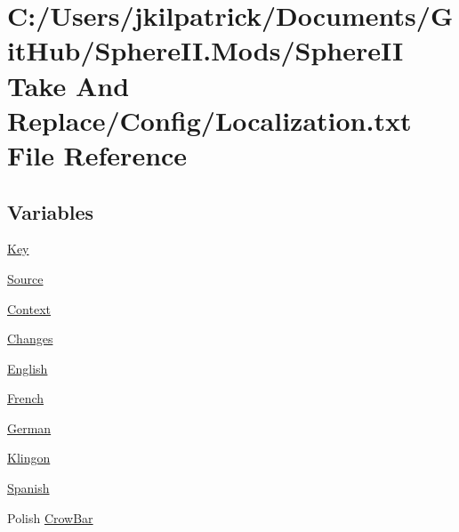 \hypertarget{_sphere_i_i_01_take_01_and_01_replace_2_config_2_localization_8txt}{}\section{C\+:/\+Users/jkilpatrick/\+Documents/\+Git\+Hub/\+Sphere\+II.Mods/\+Sphere\+II Take And Replace/\+Config/\+Localization.txt File Reference}
\label{_sphere_i_i_01_take_01_and_01_replace_2_config_2_localization_8txt}
\subsection*{Variables}
\begin{DoxyCompactItemize}
\item 
\mbox{\hyperlink{_sphere_i_i_01_take_01_and_01_replace_2_config_2_localization_8txt_ab3c7af4820830f9166ede9e5623c4e73}{Key}}
\item 
\mbox{\hyperlink{_sphere_i_i_01_take_01_and_01_replace_2_config_2_localization_8txt_a176e1eca2d1e3d1c6a064340bc6a351e}{Source}}
\item 
\mbox{\hyperlink{_sphere_i_i_01_take_01_and_01_replace_2_config_2_localization_8txt_abbebfae2c8b3c06e3115e79965277840}{Context}}
\item 
\mbox{\hyperlink{_sphere_i_i_01_take_01_and_01_replace_2_config_2_localization_8txt_aada75e543d2eadaa69533d17cac8bd9a}{Changes}}
\item 
\mbox{\hyperlink{_sphere_i_i_01_take_01_and_01_replace_2_config_2_localization_8txt_ad896b63205779b1b09e86d941ce13976}{English}}
\item 
\mbox{\hyperlink{_sphere_i_i_01_take_01_and_01_replace_2_config_2_localization_8txt_addddcf918bce70f82d5d59902a7e3fba}{French}}
\item 
\mbox{\hyperlink{_sphere_i_i_01_take_01_and_01_replace_2_config_2_localization_8txt_a18bff3d9892c435006ca22f43a9f031f}{German}}
\item 
\mbox{\hyperlink{_sphere_i_i_01_take_01_and_01_replace_2_config_2_localization_8txt_ae413412a6184b4aa46db8a189cad08d9}{Klingon}}
\item 
\mbox{\hyperlink{_sphere_i_i_01_take_01_and_01_replace_2_config_2_localization_8txt_a1a2fba2f516cad50ef94b146902a8336}{Spanish}}
\item 
Polish \mbox{\hyperlink{_sphere_i_i_01_take_01_and_01_replace_2_config_2_localization_8txt_a1aa3d24dd9be83405a9b5da647e41323}{Crow\+Bar}}

\end{DoxyCompactItemize}

